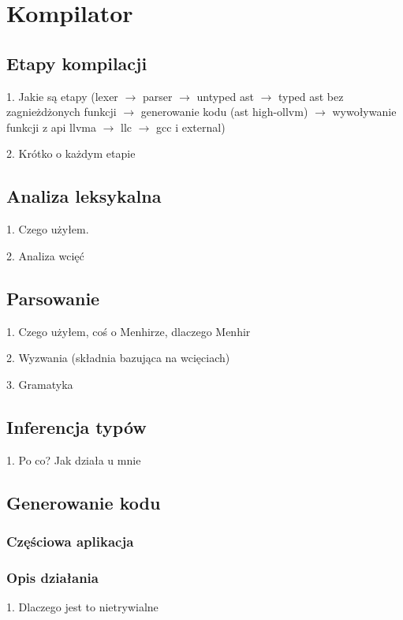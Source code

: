 \documentclass[declaration,shortabstract]{iithesis}
\begin{document}
\chapter{Kompilator}
\section{Etapy kompilacji}

1. Jakie są etapy (lexer $\rightarrow$ parser $\rightarrow$ untyped ast $\rightarrow$ 
typed ast bez zagnieżdżonych funkcji $\rightarrow$ generowanie kodu (ast high-ollvm)
$\rightarrow$ wywoływanie funkcji z api llvma $\rightarrow$ llc $\rightarrow$ gcc i external) 

2. Krótko o każdym etapie

\section{Analiza leksykalna}

1. Czego użyłem. 

2. Analiza wcięć 

\section{Parsowanie}

1. Czego użyłem, coś o Menhirze, dlaczego Menhir 

2. Wyzwania (składnia bazująca na wcięciach)

3. Gramatyka

\section{Inferencja typów}

1. Po co? Jak działa u mnie

\section{Generowanie kodu}
\subsection{Częściowa aplikacja}

\subsection{Opis działania}

1. Dlaczego jest to nietrywialne
\end{document}
